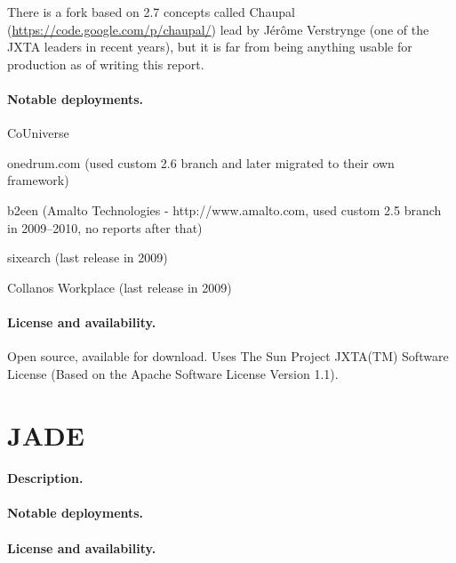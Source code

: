 \documentclass[a4paper]{report}
\begin{document}
There is a fork based on 2.7 concepts called Chaupal
(\url{https://code.google.com/p/chaupal/}) lead by J\'{e}r\^{o}me Verstrynge
(one of the JXTA leaders in recent years), but it is far from being anything
usable for production as of writing this report.

\paragraph{Notable deployments.}

\begin{compactitem}

\item CoUniverse

\item onedrum.com (used custom 2.6 branch and later migrated to their own
framework)

\item b2een (Amalto Technologies - http://www.amalto.com, used custom 2.5
branch in 2009--2010, no reports after that)

\item sixearch (last release in 2009)

\item Collanos Workplace (last release in 2009)

\end{compactitem}


\paragraph{License and availability.}

Open source, available for download. Uses The Sun Project JXTA(TM) Software License (Based on the Apache Software License Version 1.1).


\section{JADE}

\paragraph{Description.}

\paragraph{Notable deployments.}

\paragraph{License and availability.}
\end{document}
